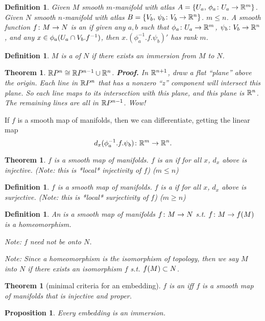 \documentclass[11pt]{amsbook}
\theoremstyle{mystyle} %
\newtheorem{thrm}[thm]{Theorem}
\newtheorem{defi}[thm]{Definition}
\newtheorem{propo}[thm]{Proposition}
\numberwithin{thm}{section}
\begin{document}
\begin{defi}
	Given $M$ smooth $m$-manifold with atlas $A = \{ U_a, \,\phi_a \colon U_a \to {\mathbb R}^m \}$.
	Given $N$ smooth $n$-manifold with atlas $B = \{ V_b, \,\psi_b \colon V_b \to {\mathbb R}^n \}$.
	$m \leq n$.
	A smooth function $f \colon M \to N$  is an  if given any $a, b$ such that $\phi_a\colon U_a \to {\mathbb R}^m$, $\psi_b\colon V_b \to {\mathbb R}^n$, and any $x \in \phi_a(U_a \cap V_b.f^{-1})$, then $x.(\phi_a^{-1}.f.\psi_b)'$ has rank $m$.
\end{defi}

\begin{defi}
	$M$ is a  of $N$ if there exists an immersion from $M$ to $N$.
\end{defi}

\begin{thrm}
	${\mathbb R} P^n \mathrel{\cong} {\mathbb R} P^{n-1} \cup {\mathbb R}^n$.
	\textbf{Proof.}  In ${\mathbb R}^{n+1}$, draw a flat ``plane'' above the origin.  Each line in ${\mathbb R} P^n$ that has a nonzero ``z'' component will intersect this plane.  So each line maps to its intersection with this plane, and this plane is ${\mathbb R}^n$.  The remaining lines are all in ${\mathbb R} P^{n-1}$.  Wow!
\end{thrm}



If $f$ is a smooth map of manifolds, then we can differentiate, getting the linear map $$d_x(\phi_a^{-1}.f.\psi_b)\colon {\mathbb R}^m \to {\mathbb R}^n.$$

\begin{thrm}
	$f$ is a smooth map of manifolds.
	$f$ is an  if for all $x$, $d_x$ above is injective.  (Note: this is *local* injectivity of $f$) ($m \leq n$)
\end{thrm}

\begin{defi}
	$f$ is a smooth map of manifolds.
	$f$ is a  if for all $x$, $d_x$ above is surjective.  (Note: this is *local* surjectivity of $f$) ($m \geq n$)
\end{defi}

\begin{defi}
	An  is a smooth map of manifolds $f\colon M \to N$ s.t. $f \colon M \to f(M)$ is a homeomorphism.

	Note: $f$ need not be onto $N$.

	Note: Since a homeomorphism is the isomorphism of topology, then we say $M$  into $N$ if there exists an isomorphism $f$ s.t. $f(M) \subset N$.
\end{defi}
\begin{thrm}[minimal criteria for an embedding]
	$f$ is an  iff $f$ is a smooth map of manifolds that is injective and proper.
\end{thrm}
\begin{propo}
	Every embedding is an immersion.
\end{propo}
\end{document}
